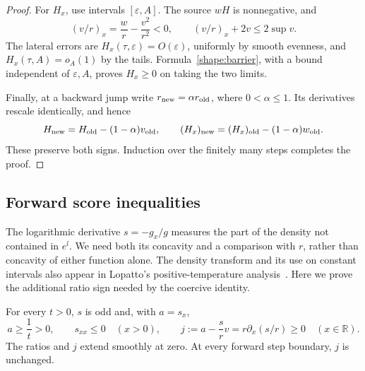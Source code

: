 \begin{proof}
For $H_x$, use intervals $[\varepsilon,A]$.  The source $wH$ is
nonnegative, and
\[
 (v/r)_x=\frac{w}{r}-\frac{v^2}{r^2}<0,
 \qquad (v/r)_x+2v\le2\sup v.
\]
The lateral errors are $H_x(\tau,\varepsilon)=O(\varepsilon)$,
uniformly by smooth evenness, and $H_x(\tau,A)=o_A(1)$ by the tails.
Formula~\eqref{shape:barrier}, with a bound independent of
$\varepsilon,A$, proves $H_x\ge0$ on taking the two limits.

Finally, at a backward jump write $r_{\rm new}=\alpha r_{\rm old}$,
where $0<\alpha\le1$.  Its derivatives rescale identically, and hence
\[
 H_{\rm new}=H_{\rm old}-(1-\alpha)v_{\rm old},\qquad
 (H_x)_{\rm new}=(H_x)_{\rm old}-(1-\alpha)w_{\rm old}.
\]
These preserve both signs.  Induction over the finitely many steps
completes the proof.
\end{proof}

\subsection{Forward score inequalities}

The logarithmic derivative $s=-g_x/g$ measures the part of the density
not contained in $e^l$.  We need both its concavity and a comparison with
$r$, rather than concavity of either function alone.
The density transform and its use on constant intervals also appear in
Lopatto's positive-temperature analysis~\cite[Sections~3, 7, and 9]{Lopatto2026}.
Here we prove the additional ratio sign needed by the coercive identity.

\begin{lemma}\label{shape:forward}
For every $t>0$, $s$ is odd and, with $a=s_x$,
\begin{equation}\label{shape:forward-signs}
 a\ge\frac1t>0,\qquad s_{xx}\le0\quad(x>0),\qquad
 j:=a-\frac sr v=r\partial_x(s/r)\ge0\quad(x\in\mathbb R).
\end{equation}
The ratios and $j$ extend smoothly at zero.  At every forward step
boundary, $j$ is unchanged.
\end{lemma}

